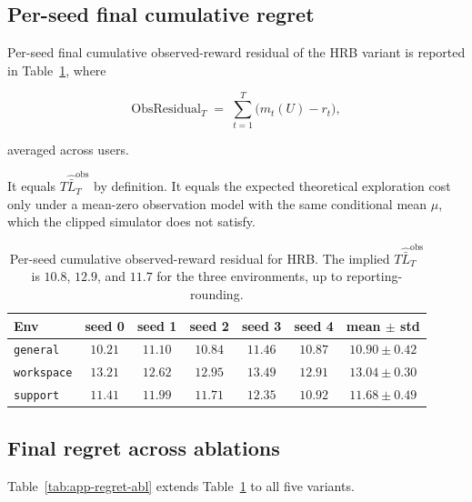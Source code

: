 \documentclass{article} %
\begin{document}
\subsection{Per-seed final cumulative regret}

\label{app:tab-regret}

Per-seed final cumulative observed-reward residual of the \textnormal{HRB}
variant is reported in Table~\ref{tab:app-regret}, where

\begin{equation}
\label{eq:app-tab-regret}
\mathrm{ObsResidual}_T
\;=\;
\sum_{t=1}^T \big(m_t(U)-r_t\big),
\end{equation}

averaged across users.

It equals \(T\widehat{\bar L}_T^{\mathrm{obs}}\) by definition. It equals the
expected theoretical exploration cost only under a mean-zero observation model
with the same conditional mean \(\mu\), which the clipped simulator does not
satisfy.

\begin{table}[h]
\centering
\small
\begin{tabular}{lcccccc}
\toprule
Env & seed 0 & seed 1 & seed 2 & seed 3 & seed 4 & mean $\pm$ std \\
\midrule
\texttt{general}                 & $10.21$ & $11.10$ & $10.84$ & $11.46$ & $10.87$ & $10.90 \pm 0.42$ \\
\texttt{workspace}               & $13.21$ & $12.62$ & $12.95$ & $13.49$ & $12.91$ & $13.04 \pm 0.30$ \\
\texttt{support}                 & $11.41$ & $11.99$ & $11.71$ & $12.35$ & $10.92$ & $11.68 \pm 0.49$ \\
\bottomrule
\end{tabular}
\caption{Per-seed cumulative observed-reward residual for HRB. The implied
\(T\widehat{\bar L}_T^{\mathrm{obs}}\) is \(10.8\), \(12.9\), and \(11.7\)
for the three environments, up to reporting-rounding.}
\label{tab:app-regret}
\end{table}

\subsection{Final regret across ablations}

\label{app:tab-regret-ablation}

Table~\ref{tab:app-regret-abl} extends Table~\ref{tab:app-regret} to all five variants.
\end{document}
